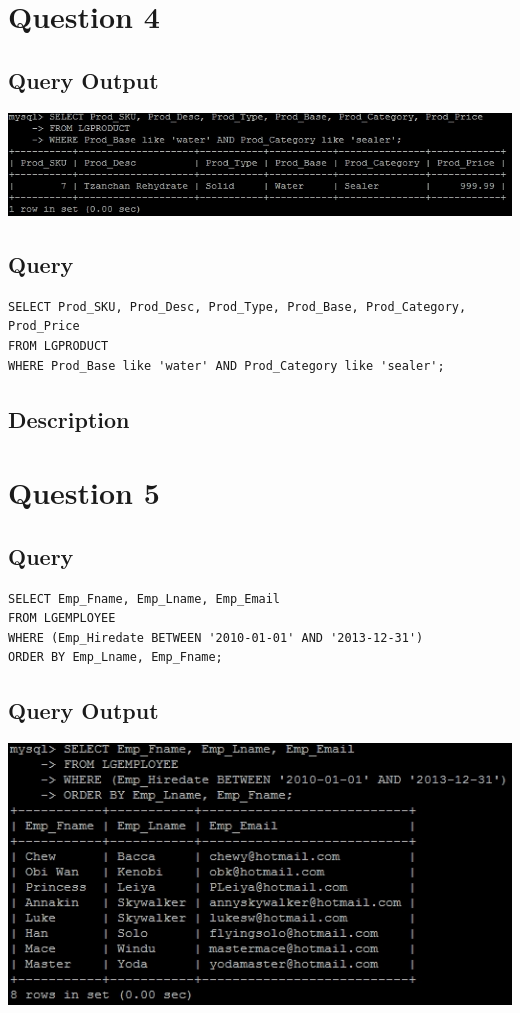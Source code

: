 \documentclass[a4paper,10pt]{article}
\begin{document}
\section*{Question 4}
\subsection{Query Output}
           \includegraphics{Queries/Question_4/Q4_screenshot.jpg}
 \subsection{Query}
          \lstset{
            language=SQL,
            breaklines=true
            }
        \begin{lstlisting}[frame=single]
        SELECT Prod_SKU, Prod_Desc, Prod_Type, Prod_Base, Prod_Category, Prod_Price
FROM LGPRODUCT
WHERE Prod_Base like 'water' AND Prod_Category like 'sealer';

        \end{lstlisting}
\subsection{Description}
\section*{Question 5}
 \subsection{Query}
          \lstset{
            language=SQL,
            breaklines=true
            }
        \begin{lstlisting}[frame=single]
        SELECT Emp_Fname, Emp_Lname, Emp_Email
FROM LGEMPLOYEE
WHERE (Emp_Hiredate BETWEEN '2010-01-01' AND '2013-12-31')
ORDER BY Emp_Lname, Emp_Fname;

        \end{lstlisting}
\subsection{Query Output}
           \includegraphics{Queries/Question_5/Q5_screenshot.jpg}
\end{document}
